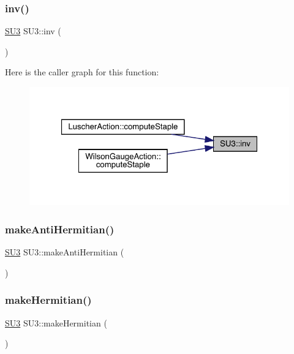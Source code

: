 \subsubsection{\texorpdfstring{inv()}{inv()}}
{\footnotesize\ttfamily \mbox{\hyperlink{class_s_u3}{S\+U3}} S\+U3\+::inv (\begin{DoxyParamCaption}{ }\end{DoxyParamCaption})\hspace{0.3cm}{\ttfamily [inline]}}

Here is the caller graph for this function\+:\nopagebreak
\begin{figure}[H]
\begin{center}
\leavevmode
\includegraphics[width=321pt]{class_s_u3_ad0e19706d3c6fdb50dcf788d4b48eb4c_icgraph}
\end{center}
\end{figure}
\mbox{\label{class_s_u3_a25e7cd46d60f25138585b76115e791a3}} 
\subsubsection{\texorpdfstring{makeAntiHermitian()}{makeAntiHermitian()}}
{\footnotesize\ttfamily \mbox{\hyperlink{class_s_u3}{S\+U3}} S\+U3\+::make\+Anti\+Hermitian (\begin{DoxyParamCaption}{ }\end{DoxyParamCaption})\hspace{0.3cm}{\ttfamily [inline]}}

\mbox{\label{class_s_u3_a7035a3e94f6dd27ece144b42473cade9}} 
\subsubsection{\texorpdfstring{makeHermitian()}{makeHermitian()}}
{\footnotesize\ttfamily \mbox{\hyperlink{class_s_u3}{S\+U3}} S\+U3\+::make\+Hermitian (\begin{DoxyParamCaption}{ }\end{DoxyParamCaption})\hspace{0.3cm}{\ttfamily [inline]}}

